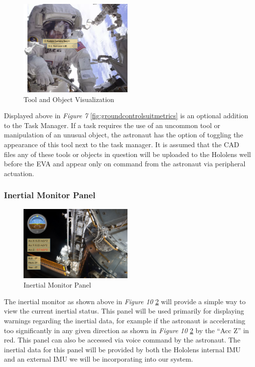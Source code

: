 \documentclass{article}
\let\Oldsubsubsection\subsubsection
\renewcommand{\subsubsection}{\FloatBarrier\Oldsubsubsection}
\begin{document}
\begin{figure}[!htb]
  \centering
  \includegraphics[width=0.5\textwidth]{assets/subtask.png}
  \caption{Tool and Object Visualization}
  \label{fig:subtask}
\end{figure}

Displayed above in \textit{Figure 7} \ref{fig:groundcontrolsuitmetrics} 
is an optional addition to the Task Manager. If a task requires the use 
of an uncommon tool or manipulation of an unusual object, the astronaut 
has the option of toggling the appearance of this tool next to the task 
manager. It is assumed that the CAD files any of these tools or objects 
in question will be uploaded to the Hololens well before the EVA and 
appear only on command from the astronaut via peripheral actuation.

\subsubsection{Inertial Monitor Panel}

\begin{figure}[!htb]
  \centering
  \includegraphics[width=0.5\textwidth]{assets/suitmetrics.png}
  \caption{Inertial Monitor Panel}
  \label{fig:suitmetrics}
\end{figure}

The inertial monitor as shown above in \textit{Figure 10} 
\ref{fig:suitmetrics} will provide a simple way to view the current 
inertial status. This panel will be used primarily for displaying 
warnings regarding the inertial data, for example if the astronaut is 
accelerating too significantly in any given direction as shown in 
\textit{Figure 10} \ref{fig:suitmetrics} by the “Acc Z” in red.  This 
panel can also be accessed via voice command by the astronaut. The 
inertial data for this panel will be provided by both the Hololens 
internal IMU and an external IMU we will be incorporating into our 
system.
\end{document}
